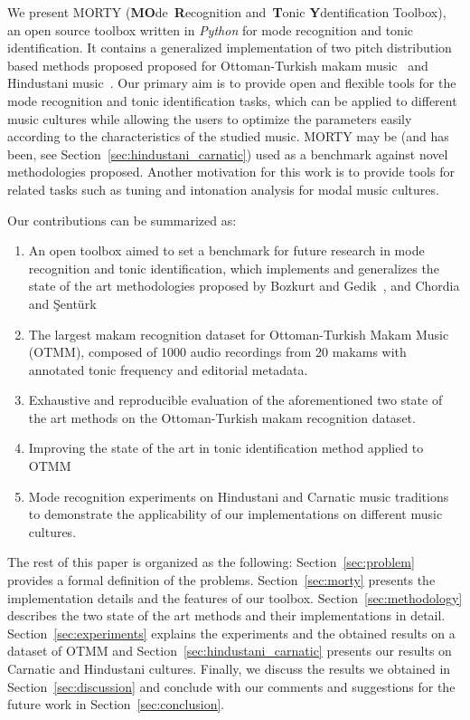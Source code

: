 \documentclass{sig-alternate}
\begin{document}
We present MORTY (\textbf{MO}de~\textbf{R}ecognition and~\textbf{T}onic \textbf{Y}den\-tification Toolbox), an open source toolbox written in \emph{Python} for mode recognition and tonic identification. It contains a generalized implementation of two pitch distribution based methods proposed proposed for Ottoman-Turkish makam music~\cite{bozkurt_tonic, bozkurt_makam} and Hindustani music~\cite{chordia}. Our primary aim is to provide open and flexible tools for the mode recognition and tonic identification tasks, which can be applied to different music cultures while allowing the users to optimize the parameters easily according to the characteristics of the studied music. MORTY may be (and has been, see Section~\ref{sec:hindustani_carnatic}) used as a benchmark against novel methodologies proposed. Another motivation for this work is to provide tools for related tasks such as tuning and intonation analysis for modal music cultures.

Our contributions can be summarized as:
\begin{enumerate}[noitemsep]
\item An open toolbox aimed to set a benchmark for future research in mode recognition and tonic identification, which implements and generalizes the state of the art methodologies propo\-sed by Bozkurt and Ge\-dik~\cite{bozkurt_tonic, bozkurt_makam}, and Chordia and \c{S}ent\"{u}rk~\cite{chordia}
\item The largest makam recognition dataset for Ottoman-Turkish Makam Music (OTMM), composed of 1000 audio recordings from 20 makams with annotated tonic frequency and editorial metadata.
\item Exhaustive and reproducible evaluation of the aforementioned two state of the art methods on the Otto\-man-Turkish makam recognition dataset.
\item Improving the state of the art in tonic identification met\-hod applied to OTMM
\item Mode recognition experiments on Hindustani and Carnatic music traditions to demonstrate the applicability of our implementations on different music cultures.
\end{enumerate}

The rest of this paper is organized as the following: Section~\ref{sec:problem} provides a formal definition of the problems. Section~\ref{sec:morty} presents the implementation details and the features of our toolbox. Section~\ref{sec:methodology} describes the two state of the art methods and their implementations in detail. Section~\ref{sec:experiments} explains the experiments and the obtained results on a dataset of OTMM and Section~\ref{sec:hindustani_carnatic} presents our results on Carnatic and Hindustani cultures. Finally, we discuss the results we obtained in Section~\ref{sec:discussion} and conclude with our comments and suggestions for the future work in Section~\ref{sec:conclusion}.
\end{document}
